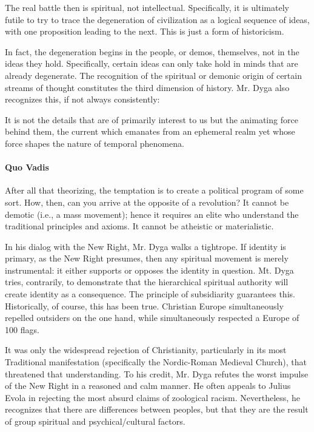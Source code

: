 The real battle then is spiritual, not intellectual. Specifically, it is ultimately futile to try to trace the degeneration of civilization as a logical sequence of ideas, with one proposition leading to the next. This is just a form of historicism.

In fact, the degeneration begins in the people, or demos, themselves, not in the ideas they hold. Specifically, certain ideas can only take hold in minds that are already degenerate. The recognition of the spiritual or demonic origin of certain streams of thought constitutes the third dimension of history. Mr. Dyga also recognizes this, if not always consistently:

\begin{quotex}
It is not the details that are of primarily interest to us but the animating force behind them, the current which emanates from an ephemeral realm yet whose force shapes the nature of temporal phenomena.
\end{quotex}


\paragraph{Quo Vadis}


After all that theorizing, the temptation is to create a political program of some sort. How, then, can you arrive at the opposite of a revolution? It cannot be demotic (i.e., a mass movement); hence it requires an elite who understand the traditional principles and axioms. It cannot be atheistic or materialistic.

In his dialog with the New Right, Mr. Dyga walks a tightrope. If identity is primary, as the New Right presumes, then any spiritual movement is merely instrumental: it either supports or opposes the identity in question. Mt. Dyga tries, contrarily, to demonstrate that the hierarchical spiritual authority will create identity as a consequence. The principle of subsidiarity guarantees this. Historically, of course, this has been true. Christian Europe simultaneously repelled outsiders on the one hand, while simultaneously respected a Europe of 100 flags.

It was only the widespread rejection of Christianity, particularly in its most Traditional manifestation (specifically the Nordic-Roman Medieval Church), that threatened that understanding. To his credit, Mr. Dyga refutes the worst impulse of the New Right in a reasoned and calm manner. He often appeals to Julius Evola in rejecting the most absurd claims of zoological racism. Nevertheless, he recognizes that there are differences between peoples, but that they are the result of group spiritual and psychical/cultural factors.

